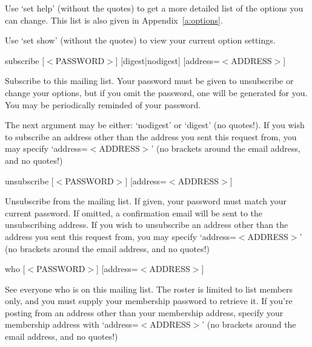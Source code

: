 \documentclass{howto}
\begin{document}
\begin{list}{}{}
\begin{list}{}{}
        Use `set help' (without the quotes) to get a more detailed list of the
        options you can change.  This list is also given in 
        Appendix~\ref{a:options}.

        Use `set show' (without the quotes) to view your current option
        settings.
		\end{list}

    \item{subscribe [$<$PASSWORD$>$] [digest|nodigest] [address=$<$ADDRESS$>$]}
		\begin{list}{}{}
			\item
        Subscribe to this mailing list.  Your password must be given to
        unsubscribe or change your options, but if you omit the password, one
        will be generated for you.  You may be periodically reminded of your
        password.

        The next argument may be either: `nodigest' or `digest' (no quotes!).
        If you wish to subscribe an address other than the address you sent
        this request from, you may specify `address=$<$ADDRESS$>$' (no brackets
        around the email address, and no quotes!)
		\end{list}

    \item {unsubscribe [$<$PASSWORD$>$] [address=$<$ADDRESS$>$]}
		\begin{list}{}{}
			\item
        Unsubscribe from the mailing list.  If given, your password must match
        your current password.  If omitted, a confirmation email will be sent
        to the unsubscribing address. If you wish to unsubscribe an address
        other than the address you sent this request from, you may specify
        `address=$<$ADDRESS$>$' (no brackets around the email address, and no
        quotes!)
		\end{list}

    \item {who [$<$PASSWORD$>$] [address=$<$ADDRESS$>$]}
		\begin{list}{}{}
			\item
        See everyone who is on this mailing list.  The roster is limited to
        list members only, and you must supply your membership password to
        retrieve it.  If you're posting from an address other than your
        membership address, specify your membership address with
        `address=$<$ADDRESS$>$' (no brackets around the email address, and no
        quotes!)
		\end{list}
\end{list}
\end{document}
